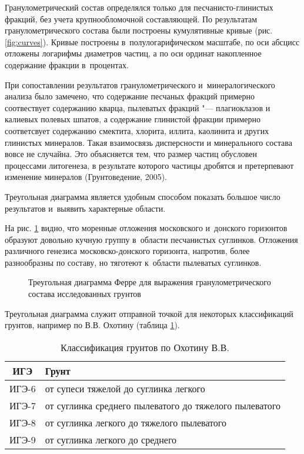 Гранулометрический состав определялся только для песчанисто-глинистых фракций, без учета крупнообломочной составляющей.
По результатам гранулометрического состава были построены кумулятивные кривые (рис. \ref{fig:curves}).
Кривые построены в~полулогарифическом масштабе, 
по оси абсцисс отложены логарифмы диаметров частиц, 
а по оси ординат накопленное содержание фракции в~процентах.

{
\small

}

При сопоставлении результатов гранулометрического и~минералогического анализа было замечено, 
что содержание песчаных фракций примерно соотвествует содержанию кварца, пылеватых фракций "--- плагиоклазов и калиевых полевых шпатов, а содержание глинистой фракции примерно соответсвует содержанию смектита, хлорита, иллита, каолинита и других глинистых минералов.
Такая взаимосвязь дисперсности и минерального состава вовсе не случайна. Это объясняется тем, что размер частиц обусловен процессами литогенеза, в результате которого частицы дробятся и претерпевают изменение минералов (Грунтоведение, 2005)\cite{grunt2005}.

Треугольная диаграмма является удобным способом показать большое число результатов и~выявить характерные области.

На рис. \ref{Fig:Ferre} видно, что моренные отложения московского и~донского горизонтов образуют довольно кучную группу в~области песчанистых суглинков.
Отложения различного генезиса московско-донского горизонта, напротив, более разнообразны по составу, но тяготеют к~области 
пылеватых суглинков.

\begin{figure}[ht]
    \centering
    \small
    
    \caption{Треугольная диаграмма Ферре для выражения гранулометрического состава исследованных грунтов}
    \label{Fig:Ferre}
\end{figure}

Треугольная диаграмма служит отправной точкой для некоторых классификаций грунтов, например по В.\;В. Охотину (таблица \ref{tab:oxot}).

\begin{table}[ht]
    \centering
    \caption{Классификация грунтов по Охотину В.\:В.} \label{tab:oxot}
    \begin{tabular}{cl}
    ИГЭ & Грунт \\
    \midrule
    ИГЭ-6 \dotfill &  от супеси тяжелой до суглинка легкого \\
    ИГЭ-7 \dotfill &  от суглинка среднего пылеватого до тяжелого пылеватого \\
    ИГЭ-8 \dotfill &  от суглинка легкого до тяжелого пылеватого \\
    ИГЭ-9 \dotfill &  от суглинка легкого до среднего \\
    \end{tabular}
\end{table}

